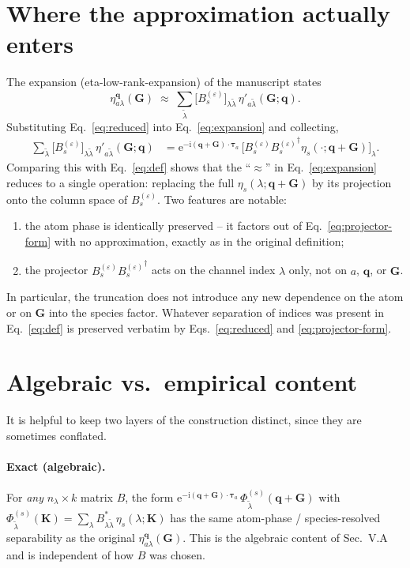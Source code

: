 \documentclass[aps,prb,reprint,superscriptaddress,nofootinbib]{revtex4-2}
\newcommand{\bG}{\mathbf G}
\newcommand{\bq}{\mathbf q}
\newcommand{\btau}{\boldsymbol\tau}
\newcommand{\ee}{\mathrm e}
\newcommand{\ii}{\mathrm i}
\begin{document}
\section{Where the approximation actually enters}

The expansion (eta-low-rank-expansion) of the manuscript states
\begin{equation}
\eta_{a\lambda}^{\bq}(\bG)
\;\approx\;
\sum_{\widetilde\lambda}
\bigl[B_s^{(\varepsilon)}\bigr]_{\lambda\widetilde\lambda}\,
\eta'_{a\widetilde\lambda}(\bG;\bq).
\label{eq:expansion}
\end{equation}
Substituting Eq.~\eqref{eq:reduced} into Eq.~\eqref{eq:expansion} and
collecting,
\begin{align}
\sum_{\widetilde\lambda}
\bigl[B_s^{(\varepsilon)}\bigr]_{\lambda\widetilde\lambda}\,
\eta'_{a\widetilde\lambda}(\bG;\bq)
&=\ee^{-\ii(\bq+\bG)\cdot\btau_a}\,
\bigl[B_s^{(\varepsilon)}{B_s^{(\varepsilon)}}^{\dagger}
\eta_s(\cdot;\bq+\bG)\bigr]_\lambda.
\label{eq:projector-form}
\end{align}
Comparing this with Eq.~\eqref{eq:def} shows that the
``\(\approx\)'' in Eq.~\eqref{eq:expansion} reduces to a single
operation: replacing the full \(\eta_s(\lambda;\bq+\bG)\) by its
projection onto the column space of \(B_s^{(\varepsilon)}\).  Two
features are notable:
\begin{enumerate}
\item the atom phase is identically preserved -- it factors out of
Eq.~\eqref{eq:projector-form} with no approximation, exactly as in the
original definition;
\item the projector \(B_s^{(\varepsilon)}{B_s^{(\varepsilon)}}^{\dagger}\)
acts on the channel index \(\lambda\) only, not on \(a\), \(\bq\), or
\(\bG\).
\end{enumerate}
In particular, the truncation does not introduce any new dependence on
the atom or on \(\bG\) into the species factor.  Whatever separation
of indices was present in Eq.~\eqref{eq:def} is preserved verbatim by
Eqs.~\eqref{eq:reduced} and \eqref{eq:projector-form}.

\section{Algebraic vs.\ empirical content}

It is helpful to keep two layers of the construction distinct, since
they are sometimes conflated.

\paragraph{Exact (algebraic).}  For \emph{any} \(n_\lambda\times k\)
matrix \(B\), the form
\(\ee^{-\ii(\bq+\bG)\cdot\btau_a}\,\Phi^{(s)}_{\widetilde\lambda}(\bq+\bG)\)
with
\(\Phi^{(s)}_{\widetilde\lambda}(\mathbf K)
=\sum_\lambda B^{*}_{\lambda\widetilde\lambda}\,\eta_s(\lambda;\mathbf K)\)
has the same atom-phase / species-resolved separability as the original
\(\eta_{a\lambda}^{\bq}(\bG)\).  This is the algebraic content of
Sec.~V.A and is independent of how \(B\) was chosen.
\end{document}

